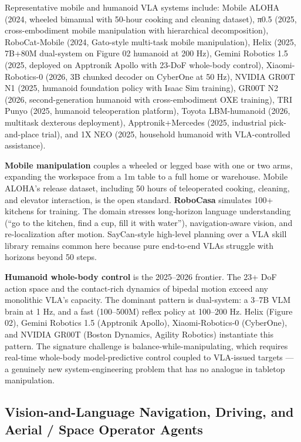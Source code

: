 \documentclass{article}
\begin{document}
Representative mobile and humanoid VLA systems include: Mobile ALOHA (2024, wheeled bimanual with 50-hour cooking and cleaning dataset), π0.5 (2025, cross-embodiment mobile manipulation with hierarchical decomposition), RoboCat-Mobile (2024, Gato-style multi-task mobile manipulation), Helix (2025, 7B+80M dual-system on Figure 02 humanoid at 200 Hz), Gemini Robotics 1.5 (2025, deployed on Apptronik Apollo with 23-DoF whole-body control), Xiaomi-Robotics-0 (2026, 3B chunked decoder on CyberOne at 50 Hz), NVIDIA GR00T N1 (2025, humanoid foundation policy with Isaac Sim training), GR00T N2 (2026, second-generation humanoid with cross-embodiment OXE training), TRI Punyo (2025, humanoid teleoperation platform), Toyota LBM-humanoid (2026, multitask dexterous deployment), Apptronik+Mercedes (2025, industrial pick-and-place trial), and 1X NEO (2025, household humanoid with VLA-controlled assistance).

\textbf{Mobile manipulation} couples a wheeled or legged base with one or two arms, expanding the workspace from a 1m table to a full home or warehouse. Mobile ALOHA's release dataset, including 50 hours of teleoperated cooking, cleaning, and elevator interaction, is the open standard. \textbf{RoboCasa} simulates 100+ kitchens for training. The domain stresses long-horizon language understanding (``go to the kitchen, find a cup, fill it with water''), navigation-aware vision, and re-localization after motion. SayCan-style high-level planning over a VLA skill library remains common here because pure end-to-end VLAs struggle with horizons beyond 50 steps.

\textbf{Humanoid whole-body control} is the 2025--2026 frontier. The 23+ DoF action space and the contact-rich dynamics of bipedal motion exceed any monolithic VLA's capacity. The dominant pattern is dual-system: a 3--7B VLM brain at 1 Hz, and a fast (100--500M) reflex policy at 100--200 Hz. Helix (Figure 02), Gemini Robotics 1.5 (Apptronik Apollo), Xiaomi-Robotics-0 (CyberOne), and NVIDIA GR00T (Boston Dynamics, Agility Robotics) instantiate this pattern. The signature challenge is balance-while-manipulating, which requires real-time whole-body model-predictive control coupled to VLA-issued targets --- a genuinely new system-engineering problem that has no analogue in tabletop manipulation.

\subsection{Vision-and-Language Navigation, Driving, and Aerial / Space Operator Agents}\label{vision-and-language-navigation-driving-and-aerial-space-operator-agents}
\end{document}
